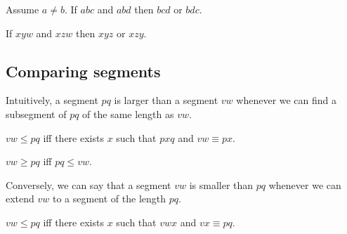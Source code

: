 \documentclass[10pt,a4paper,parskip=half,numbers=endperiod,headings=standardclasses,parskip]{scrbook}
\newcommand{\Cong}[4]{#1 #2 \equiv #3 #4}
\newcommand{\Betw}[3]{#1 #2 #3}
\newcommand{\Leq}[4]{#1 #2 \leq #3 #4}
\newcommand{\Geq}[4]{#1 #2 \geq #3 #4}
\begin{document}
  \begin{forthel}
    \begin{lemma} %
      Assume $a \neq b$.
      If $\Betw{a}{b}{c}$ and $\Betw{a}{b}{d}$
      then $\Betw{b}{c}{d}$ or $\Betw{b}{d}{c}$.
    \end{lemma}

    \begin{theorem} %
      If $\Betw{x}{y}{w}$ and $\Betw{x}{z}{w}$ then $\Betw{x}{y}{z}$ or $\Betw{x}{z}{y}$.
    \end{theorem}
  \end{forthel}

  \subsection{Comparing segments}

  Intuitively, a segment $pq$ is larger than a segment $vw$ whenever we can find a subsegment
  of $pq$ of the same length as $vw$.

  \begin{forthel}
    \begin{definition} %
      $\Leq{v}{w}{p}{q}$ iff there exists $x$ such that $\Betw{p}{x}{q}$ and $\Cong{v}{w}{p}{x}$.
    \end{definition}

    \begin{definition} %
      $\Geq{v}{w}{p}{q}$ iff $\Leq{p}{q}{v}{w}$.
    \end{definition}
  \end{forthel}

  Conversely, we can say that a segment $vw$ is smaller than $pq$ whenever we can extend $vw$
  to a segment of the length $pq$.

    \begin{axiom} %
      $\Leq{v}{w}{p}{q}$ iff there exists $x$ such that $\Betw{v}{w}{x}$ and $\Cong{v}{x}{p}{q}$.
    \end{axiom}
\end{document}
